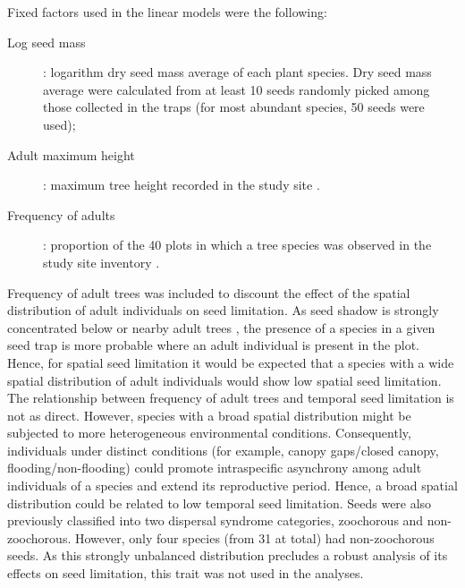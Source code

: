 \documentclass{article}
\begin{document}
Fixed factors used in the linear models were the following:
\begin{description}
\item[Log seed mass]: logarithm dry seed mass average of each plant
  species. Dry seed mass average were calculated from at least 10
  seeds randomly picked among those collected in the traps (for most
  abundant species, 50 seeds were used);
\item[Adult maximum height]: maximum tree height recorded in the study
  site \cite{pansonato2018}.
\item[Frequency of adults]: proportion of the 40 plots in which a tree
  species was observed in the study site inventory
  \cite{pansonato2018}.
\end{description}


Frequency of adult trees was included to discount the effect of the
spatial distribution of adult individuals on seed limitation. As seed
shadow is strongly concentrated below or nearby adult trees
\cite{flores2013introduced,larios2018}, the presence of a species in a
given seed trap is more probable where an adult individual is present
in the plot. Hence, for spatial seed limitation it would be expected
that a species with a wide spatial distribution of adult individuals
would show low spatial seed limitation. The relationship between
frequency of adult trees and temporal seed limitation is not as
direct. However, species with a broad spatial distribution might be
subjected to more heterogeneous environmental
conditions. Consequently, individuals under distinct conditions (for
example, canopy gaps/closed canopy, flooding/non-flooding) could
promote intraspecific asynchrony among adult individuals of a species
and extend its reproductive period. Hence, a broad spatial
distribution could be related to low temporal seed limitation. Seeds
were also previously classified into two dispersal syndrome
categories, zoochorous and non-zoochorous. However, only four species
(from 31 at total) had non-zoochorous seeds. As this strongly
unbalanced distribution precludes a robust analysis of its effects on
seed limitation, this trait was not used in the analyses.
\end{document}
